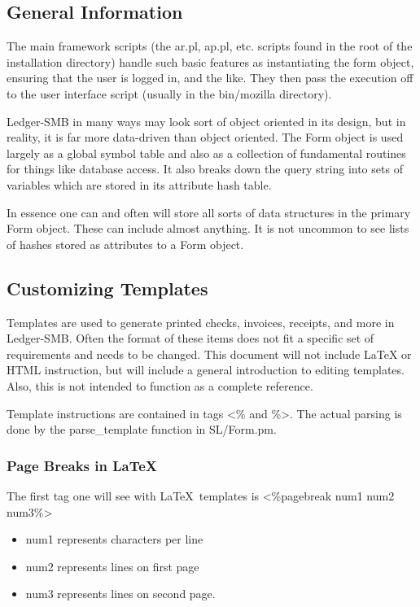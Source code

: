 \documentclass{article}
\begin{document}
\subsection{General Information}
The main framework scripts (the ar.pl, ap.pl, etc. scripts found in the root of
the installation directory) handle such basic features as instantiating the form
object, ensuring that the user is logged in, and the like.  They then pass the
execution off to the user interface script (usually in the bin/mozilla
directory).

Ledger-SMB in many ways may look sort of object oriented in its design, but in
reality, it is far more data-driven than object oriented.  The Form object is
used largely as a global symbol table and also as a collection of fundamental
routines for things like database access.  It also breaks down the query string
into sets of variables which are stored in its attribute hash table.

In essence one can and often will store all sorts of data structures in the
primary Form object.  These can include almost anything.  It is not uncommon to
see lists of hashes stored as attributes to a Form object.

\subsection{Customizing Templates}
Templates are used to generate printed checks, invoices, receipts, and more in
Ledger-SMB. Often the format of these items does not fit a specific set of
requirements and needs to be changed. This document will not include LaTeX or
HTML instruction, but will include a general introduction to editing templates.
Also, this is not intended to function as a complete reference.

Template instructions are contained in tags \textless\% and \%\textgreater. 
The actual parsing is done by the parse\_template function in SL/Form.pm.

\subsubsection{Page Breaks in \LaTeX}
The first tag one will see with \LaTeX\ templates is \textless\%pagebreak num1 
num2 num3\%\textgreater

\begin{itemize}
\item num1 represents characters per line
\item num2 represents lines on first page
\item num3 represents lines on second page.
\end{itemize}
\end{document}
